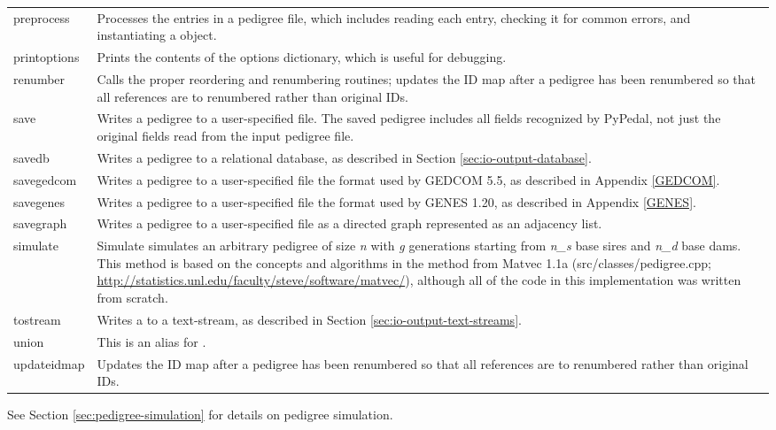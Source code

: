 \begin{center}
\begin{xtabular}{l|p{4in}}
		preprocess & Processes the entries in a pedigree file, which includes reading each entry, checking it for common errors, and instantiating a  object. \\
		printoptions & Prints the contents of the options dictionary, which is useful for debugging. \\
		renumber & Calls the proper reordering and renumbering routines; updates the ID map after a pedigree has been renumbered so that all references are to renumbered rather than original IDs. \\
		save & Writes a \PyPedal{} pedigree to a user-specified file.  The saved pedigree includes all fields recognized by PyPedal, not just the original fields read from the input pedigree file. \\
		savedb & Writes a \PyPedal{} pedigree to a relational database, as described in Section \ref{sec:io-output-database}. \\
		savegedcom & Writes a \PyPedal{} pedigree to a user-specified file the format used by GEDCOM 5.5, as described in Appendix \ref{GEDCOM}. \\
		savegenes & Writes a \PyPedal{} pedigree to a user-specified file the format used by GENES 1.20, as described in Appendix \ref{GENES}. \\
		savegraph & Writes a \PyPedal{} pedigree to a user-specified file as a directed graph represented as an adjacency list. \\
		simulate & Simulate simulates an arbitrary pedigree of size \textit{n} with \textsl{g} generations starting from \textsl{n\_s} base sires and \textsl{n\_d} base dams.  This method is based on the concepts and algorithms in the  method from Matvec 1.1a (src/classes/pedigree.cpp; \url{http://statistics.unl.edu/faculty/steve/software/matvec/}), although all of the code in this implementation was written from scratch.\\
		tostream & Writes a  to a text-stream, as described in Section \ref{sec:io-output-text-streams}. \\
		union & This is an alias for . \\
		updateidmap & Updates the ID map after a pedigree has been renumbered so that all references are to renumbered rather than original IDs. \\
    \end{xtabular}
\end{center}
See Section \ref{sec:pedigree-simulation} for details on pedigree simulation.
